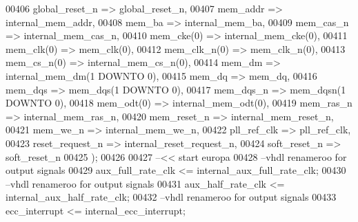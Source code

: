 \begin{DoxyCode}
00406             global_reset_n => global_reset_n,
00407             mem_addr => internal_mem_addr,
00408             mem_ba => internal_mem_ba,
00409             mem_cas_n => internal_mem_cas_n,
00410             mem_cke\textcolor{vhdlchar}{(}\textcolor{vhdllogic}{0}\textcolor{vhdlchar}{)} => internal_mem_cke\textcolor{vhdlchar}{(}\textcolor{vhdllogic}{0}\textcolor{vhdlchar}{)},
00411             mem_clk\textcolor{vhdlchar}{(}\textcolor{vhdllogic}{0}\textcolor{vhdlchar}{)} => mem_clk\textcolor{vhdlchar}{(}\textcolor{vhdllogic}{0}\textcolor{vhdlchar}{)},
00412             mem_clk_n\textcolor{vhdlchar}{(}\textcolor{vhdllogic}{0}\textcolor{vhdlchar}{)} => mem_clk_n\textcolor{vhdlchar}{(}\textcolor{vhdllogic}{0}\textcolor{vhdlchar}{)},
00413             mem_cs_n\textcolor{vhdlchar}{(}\textcolor{vhdllogic}{0}\textcolor{vhdlchar}{)} => internal_mem_cs_n\textcolor{vhdlchar}{(}\textcolor{vhdllogic}{0}\textcolor{vhdlchar}{)},
00414             mem_dm => internal_mem_dm\textcolor{vhdlchar}{(}\textcolor{vhdllogic}{1} \textcolor{keywordflow}{DOWNTO} \textcolor{vhdllogic}{0}\textcolor{vhdlchar}{)},
00415             mem_dq => mem_dq,
00416             mem_dqs => mem_dqs\textcolor{vhdlchar}{(}\textcolor{vhdllogic}{1} \textcolor{keywordflow}{DOWNTO} \textcolor{vhdllogic}{0}\textcolor{vhdlchar}{)},
00417             mem_dqs_n => mem_dqsn\textcolor{vhdlchar}{(}\textcolor{vhdllogic}{1} \textcolor{keywordflow}{DOWNTO} \textcolor{vhdllogic}{0}\textcolor{vhdlchar}{)},
00418             mem_odt\textcolor{vhdlchar}{(}\textcolor{vhdllogic}{0}\textcolor{vhdlchar}{)} => internal_mem_odt\textcolor{vhdlchar}{(}\textcolor{vhdllogic}{0}\textcolor{vhdlchar}{)},
00419             mem_ras_n => internal_mem_ras_n,
00420             mem_reset_n => internal_mem_reset_n,
00421             mem_we_n => internal_mem_we_n,
00422             pll_ref_clk => pll_ref_clk,
00423             reset_request_n => internal_reset_request_n,
00424             soft_reset_n => soft_reset_n
00425     \textcolor{vhdlchar}{)};
00426 
00427 \textcolor{keyword}{  --<< start europa}
00428 \textcolor{keyword}{  --vhdl renameroo for output signals}
00429   \textcolor{vhdlchar}{aux_full_rate_clk} \textcolor{vhdlchar}{<=} \textcolor{vhdlchar}{internal_aux_full_rate_clk};
00430 \textcolor{keyword}{  --vhdl renameroo for output signals}
00431   \textcolor{vhdlchar}{aux_half_rate_clk} \textcolor{vhdlchar}{<=} \textcolor{vhdlchar}{internal_aux_half_rate_clk};
00432 \textcolor{keyword}{  --vhdl renameroo for output signals}
00433   \textcolor{vhdlchar}{ecc_interrupt} \textcolor{vhdlchar}{<=} \textcolor{vhdlchar}{internal_ecc_interrupt};

\end{DoxyCode}
